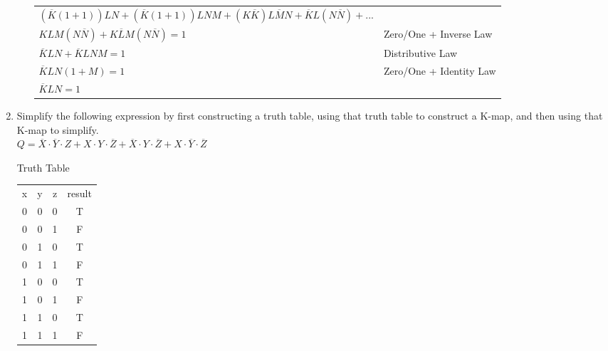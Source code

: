 \documentclass{article}
\begin{document}
\begin{enumerate}
\begin{enumerate}
\begin{tabular}{l l}
                $(\overline{K}(1+1))LN + (\overline{K}(1+1))LNM + (K\overline{K})L\overline{M}N + \overline{K}L(N\overline{N}) +$...\\ $KLM(N\overline{N}) + K\overline{L}M(N\overline{N}) = 1$ & Zero/One + Inverse Law\\
                $\overline{K}LN + \overline{K}LNM = 1$ & Distributive Law\\
                $\overline{K}LN(1+M) = 1$ & Zero/One + Identity Law\\
                $\overline{K}LN = 1$
            \end{tabular}
            \begin{center}
            \end{center}
        \end{enumerate}
        \item Simplify the following expression by first constructing a truth table, using that truth table to construct a K-map, and then using that K-map to simplify.\\
        $Q = \overline{X} \cdot \overline{Y} \cdot Z + X \cdot Y \cdot \overline{Z} + \overline{X} \cdot Y \cdot \overline{Z} + X \cdot \overline{Y} \cdot \overline{Z}$\\[0.25in]

        \begin{center}
            Truth Table\\
            \begin{tabular}{c | c | c | c}
                x & y & z & result\\
                0 & 0 & 0 & T\\
                0 & 0 & 1 & F\\
                0 & 1 & 0 & T\\
                0 & 1 & 1 & F\\
                1 & 0 & 0 & T\\
                1 & 0 & 1 & F\\
                1 & 1 & 0 & T\\
                1 & 1 & 1 & F\\
            \end{tabular}\\[0.25in]
        \end{center}
        


\end{enumerate}
\end{document}
